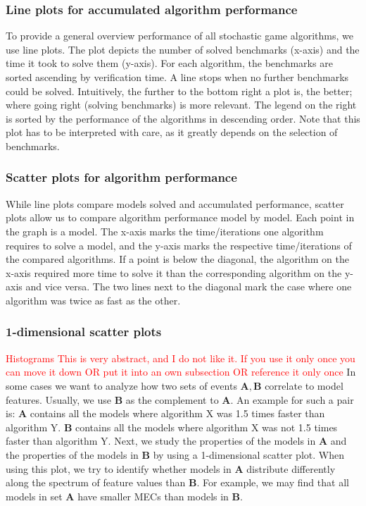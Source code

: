 \subsubsection*{Line plots for accumulated algorithm performance} \label{plot:starplot}
To provide a general overview performance of all stochastic game algorithms, we use line plots.
The plot depicts the number of solved benchmarks (x-axis) and the time it took to solve them (y-axis). 
For each algorithm, the benchmarks are sorted ascending by verification time. A line stops when no further benchmarks could be solved.
Intuitively, the further to the bottom right a plot is, the better; where going right (solving benchmarks) is more relevant.
The legend on the right is sorted by the performance of the algorithms in descending order.
Note that this plot has to be interpreted with care, as it greatly depends on the selection of benchmarks.

\subsubsection*{Scatter plots for algorithm performance} \label{plot:performanceScatter}
While line plots compare models solved and accumulated performance, scatter plots allow us to compare algorithm performance model by model.
Each point in the graph is a model. The x-axis marks the time/iterations one algorithm requires to solve a model, and the y-axis marks the respective time/iterations of the compared algorithms.
If a point is below the diagonal, the algorithm on the x-axis required more time to solve it than the corresponding algorithm on the y-axis and vice versa.
The two lines next to the diagonal mark the case where one algorithm was twice as fast as the other.

\subsubsection*{1-dimensional scatter plots} \label{plot:1Dscatter}
\textcolor{red}{Histograms}
\textcolor{red}{This is very abstract, and I do not like it. If you use it only once you can move it down OR put it into an own subsection OR reference it only once}
In some cases we want to analyze how two sets of events $\mathbf{A}, \mathbf{B}$ correlate to model features. 
Usually, we use $\mathbf{B}$ as the complement to $\mathbf{A}$.
An example for such a pair is: 
$\mathbf{A}$ contains all the models where algorithm X was 1.5 times faster than algorithm Y.
$\mathbf{B}$ contains all the models where algorithm X was not 1.5 times faster than algorithm Y.
Next, we study the properties of the models in $\mathbf{A}$ and the properties of the models in $\mathbf{B}$ 
by using a 1-dimensional scatter plot. When using this plot, we try to identify whether models in $\mathbf{A}$ distribute
differently along the spectrum of feature values than $\mathbf{B}$.
For example, we may find that all models in set $\mathbf{A}$ have smaller MECs than models in $\mathbf{B}$. 


